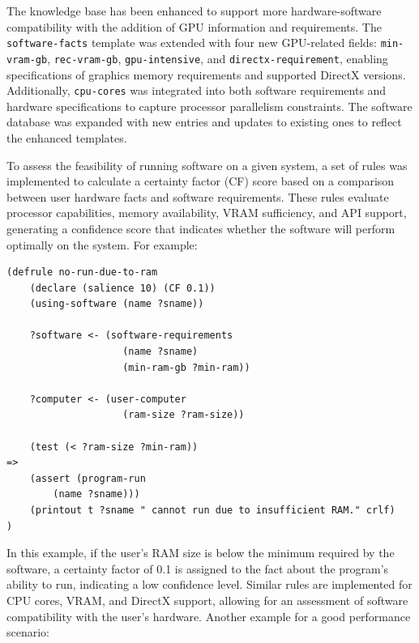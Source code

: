 \documentclass{article}
\begin{document}


The knowledge base has been enhanced to support more hardware-software compatibility with the addition of GPU information and requirements. The \texttt{software-facts} template was extended with four new GPU-related fields: \texttt{min-vram-gb}, \texttt{rec-vram-gb}, \texttt{gpu-intensive}, and \texttt{directx-requirement}, enabling specifications of graphics memory requirements and supported DirectX versions. Additionally, \texttt{cpu-cores} was integrated into both software requirements and hardware specifications to capture processor parallelism constraints. The software database was expanded with new entries and updates to existing ones to reflect the enhanced templates.

To assess the feasibility of running software on a given system, a set of rules was implemented to calculate a certainty factor (CF) score based on a comparison between user hardware facts and software requirements. These rules evaluate processor capabilities, memory availability, VRAM sufficiency, and API support, generating a confidence score that indicates whether the software will perform optimally on the system. For example:

\begin{file}
    \begin{lstlisting}
(defrule no-run-due-to-ram
    (declare (salience 10) (CF 0.1))
    (using-software (name ?sname))
    
    ?software <- (software-requirements
                    (name ?sname)
                    (min-ram-gb ?min-ram))
    
    ?computer <- (user-computer
                    (ram-size ?ram-size))
    
    (test (< ?ram-size ?min-ram))
=>
    (assert (program-run
        (name ?sname)))
    (printout t ?sname " cannot run due to insufficient RAM." crlf)
)
\end{lstlisting}
\end{file}

In this example, if the user's RAM size is below the minimum required by the software, a certainty factor of 0.1 is assigned to the fact about the program's ability to run, indicating a low confidence level. Similar rules are implemented for CPU cores, VRAM, and DirectX support, allowing for an assessment of software compatibility with the user's hardware. Another example for a good performance scenario:
\end{document}
